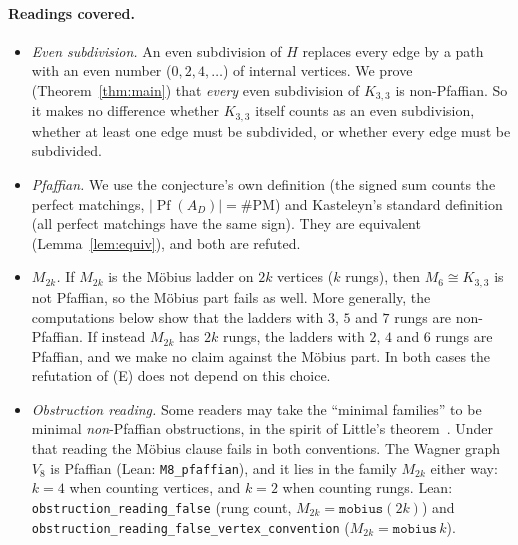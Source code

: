 \documentclass[11pt]{article}
\theoremstyle{definition}
\theoremstyle{remark}
\begin{document}
\paragraph{Readings covered.}
\begin{itemize}
\item \emph{Even subdivision.} An even subdivision of $H$ replaces every edge by a
path with an even number ($0,2,4,\dots$) of internal vertices. We prove
(Theorem~\ref{thm:main}) that \emph{every} even subdivision of $K_{3,3}$ is
non-Pfaffian. So it makes no difference whether $K_{3,3}$ itself counts as an even
subdivision, whether at least one edge must be subdivided, or whether every
edge must be subdivided.
\item \emph{Pfaffian.} We use the conjecture's own definition (the signed sum
counts the perfect matchings, $|\operatorname{Pf}(A_D)|=\#\mathrm{PM}$) and
Kasteleyn's standard definition (all perfect matchings have the same sign). They
are equivalent (Lemma~\ref{lem:equiv}), and both are refuted.
\item \emph{$M_{2k}$.} If $M_{2k}$ is the M\"obius ladder on $2k$ vertices ($k$
rungs), then $M_6\cong K_{3,3}$ is not Pfaffian, so the M\"obius part fails as well.
More generally, the computations below show that the ladders with $3$, $5$ and $7$
rungs are non-Pfaffian. If instead $M_{2k}$ has $2k$ rungs, the ladders with $2$, $4$
and $6$ rungs are Pfaffian, and we make no claim against the M\"obius part. In
both cases the refutation of (E) does not depend on this choice.
\item \emph{Obstruction reading.} Some readers may take the ``minimal families''
to be minimal \emph{non}-Pfaffian obstructions, in the spirit of Little's
theorem~\cite{little}. Under that reading the M\"obius clause fails in both
conventions. The Wagner graph $V_8$ is Pfaffian (Lean: \texttt{M8\_pfaffian}), and it
lies in the family $M_{2k}$ either way: $k=4$ when counting vertices, and $k=2$ when
counting rungs. Lean: \texttt{obstruction\_reading\_false} (rung count,
$M_{2k}=\texttt{mobius}(2k)$) and
\texttt{obstruction\_reading\_false\_vertex\_convention} ($M_{2k}=\texttt{mobius}\,k$).
\end{itemize}
\end{document}
